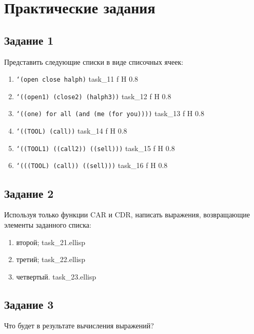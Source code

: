 \chapter{Практические задания}

\section{Задание 1}

Представить следующие списки в виде списочных ячеек:
\begin{enumerate}
	\item \texttt{`(open close halph)}
		{task_11}
		{f}
		{H}
		{0.8\textwidth}
		{}
	\item \texttt{`((open1) (close2) (halph3))}
		{task_12}
		{f}
		{H}
		{0.8\textwidth}
		{}
	\item \texttt{`((one) for all (and (me (for you))))}
		{task_13}
		{f}
		{H}
		{0.8\textwidth}
		{}
	\item \texttt{`((TOOL) (call))}
		{task_14}
		{f}
		{H}
		{0.8\textwidth}
		{}
	\item \texttt{`((TOOL1) ((call2)) ((sell)))}
		{task_15}
		{f}
		{H}
		{0.8\textwidth}
		{}
	\item \texttt{`(((TOOL) (call)) ((sell)))}
		{task_16}
		{f}
		{H}
		{0.8\textwidth}
		{}
\end{enumerate}

\section{Задание 2}

Используя только функции CAR и CDR, написать выражения, возвращающие элементы заданного списка:
\begin{enumerate}
	\item второй;
		{task_21.el}{lisp}{}
	\item третий;
		{task_22.el}{lisp}{}
	\item четвертый.
		{task_23.el}{lisp}{}
\end{enumerate}

\section{Задание 3}

Что будет в результате вычисления выражений?

